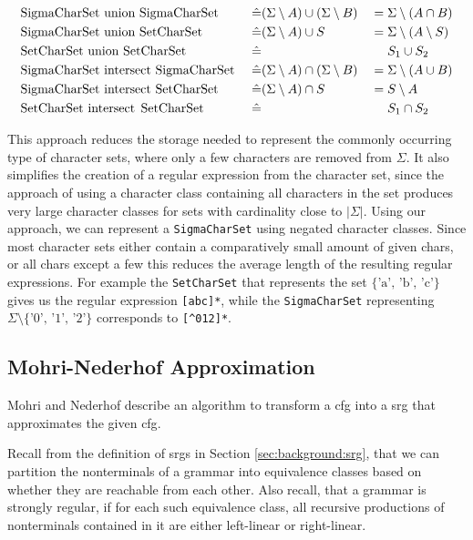 \noindent
\begin{alignat*}{3}
	& \text{\lstinline|SigmaCharSet union SigmaCharSet| } && \hat{=} (\Sigma \setminus A) \cup (\Sigma \setminus B) & &= \Sigma \setminus (A \cap B) \\
	& \text{\lstinline|SigmaCharSet union SetCharSet| } && \hat{=} (\Sigma \setminus A) \cup S & &= \Sigma \setminus (A \setminus S) \\
	& \text{\lstinline|SetCharSet union SetCharSet| } && \hat{=} & &\phantom{{}={}} S_1 \cup S_2 \\
	& \text{\lstinline|SigmaCharSet intersect SigmaCharSet| } && \hat{=} (\Sigma \setminus A) \cap (\Sigma \setminus B) & &= \Sigma \setminus (A \cup B) \\
	& \text{\lstinline|SigmaCharSet intersect SetCharSet| } && \hat{=} (\Sigma \setminus A) \cap S & &= S \setminus A \\
	& \text{\lstinline|SetCharSet intersect SetCharSet| } && \hat{=} & &\phantom{{}={}} S_1 \cap S_2
\end{alignat*}

This approach reduces the storage needed to represent the commonly occurring type of character sets, where only a few characters are removed from $\Sigma$. It also simplifies the creation of a regular expression from the character set, since the approach of using a character class containing all characters in the set produces very large character classes for sets with cardinality close to $|\Sigma|$. Using our approach, we can represent a \lstinline|SigmaCharSet| using negated character classes. Since most character sets either contain a comparatively small amount of given chars, or all chars except a few this reduces the average length of the resulting regular expressions. 
For example the \lstinline|SetCharSet| that represents the set $\{\text{'a', 'b', 'c'}\}$ gives us the regular expression \lstinline|[abc]*|, while the \lstinline|SigmaCharSet| representing $\Sigma \setminus \{\text{'0', '1', '2'}\}$ corresponds to \lstinline|[^012]*|.

		
\subsection{Mohri-Nederhof Approximation}\label{sec:mohriNederhofApprox}


Mohri and Nederhof \cite{mohri_nederhof} describe an algorithm to transform a \ac{cfg} into a \ac{srg} that approximates the given \ac{cfg}.

Recall from the definition of \acp{srg} in Section \ref{sec:background:srg}, that we can partition the nonterminals of a grammar into equivalence classes based on whether they are reachable from each other. Also recall, that a grammar is strongly regular, if for each such equivalence class, all recursive productions of nonterminals contained in it are either left-linear or right-linear.

